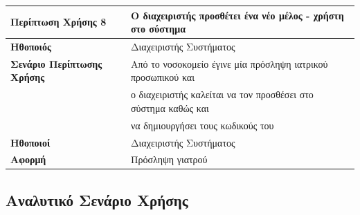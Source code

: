 \documentclass{article}
\newcommand\T{\rule{0pt}{2.6ex}}       %
\newcommand\B{\rule[-1.2ex]{0pt}{0pt}}
\begin{document}
\begin{center}
     \begin{tabular}{|l|l|}
     \hline
      \textbf{Περίπτωση Χρήσης 8} & Ο διαχειριστής προσθέτει ένα νέο μέλος - χρήστη στο σύστημα \T\B \\ 
      \hline
      \textbf{Ηθοποιός} & Διαχειριστής Συστήματος \T\B \\
      \hline
      \textbf{Σενάριο Περίπτωσης Χρήσης} & Από το νοσοκομείο έγινε μία πρόσληψη ιατρικού προσωπικού και \T \\& ο διαχειριστής καλείται να τον προσθέσει στο σύστημα καθώς και \\& να δημιουργήσει τους κωδικούς του \B \\
      \hline
      \textbf{Ηθοποιοί} & Διαχειριστής Συστήματος \T\B \\
      \hline
      \textbf{Αφορμή} & Πρόσληψη γιατρού \T\B \\
      \hline
     \end{tabular}
 \end{center}
 
  \subsection{Αναλυτικό Σενάριο Χρήσης}
\end{document}
